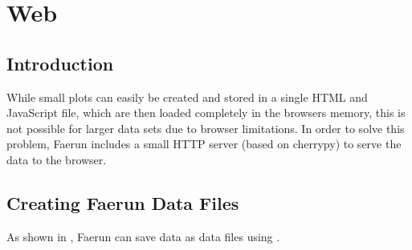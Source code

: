 \documentclass[letterpaper,10pt,english]{sphinxmanual}
\begin{document}
\begin{sphinxVerbatim}[commandchars=\\\{\}]

        
          

   
\end{sphinxVerbatim}


\section{Web}
\label{\detokenize{host:web}}\label{\detokenize{host::doc}}

\subsection{Introduction}
\label{\detokenize{host:introduction}}
While small plots can easily be created and stored in a single HTML and JavaScript file, which are then loaded completely in the browsers memory, this is not possible for larger data sets due to browser limitations.
In order to solve this problem, Faerun includes a small HTTP server (based on cherrypy) to serve the data to the browser.


\subsection{Creating Faerun Data Files}
\label{\detokenize{host:creating-faerun-data-files}}
As shown in {\hyperref[\detokenize{tutorial::doc}]{}}, Faerun can save data as  data files using .

\begin{sphinxVerbatim}[commandchars=\\\{\}]
    
      
\end{sphinxVerbatim}
\end{document}
